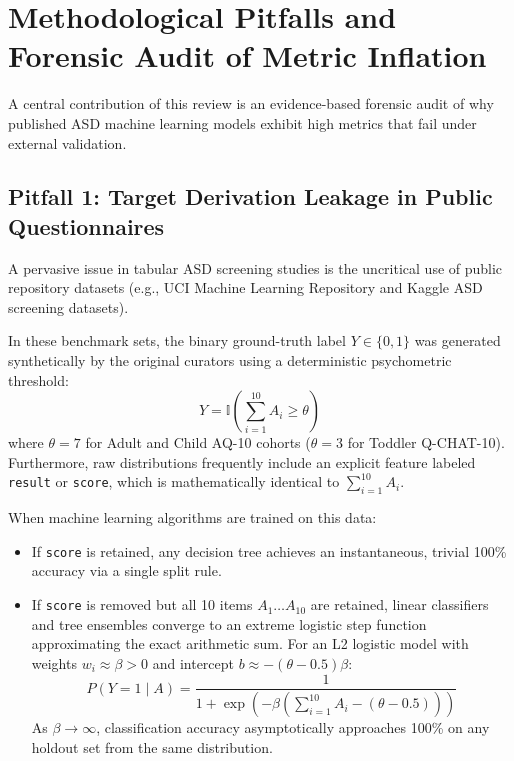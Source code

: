 \documentclass[journal]{IEEEtran}
\begin{document}
\section{Methodological Pitfalls and Forensic Audit of Metric Inflation}

A central contribution of this review is an evidence-based forensic audit of why published ASD machine learning models exhibit high metrics that fail under external validation.

\subsection{Pitfall 1: Target Derivation Leakage in Public Questionnaires}
A pervasive issue in tabular ASD screening studies \cite{thabtah2019machine, mythili2014study} is the uncritical use of public repository datasets (e.g., UCI Machine Learning Repository and Kaggle ASD screening datasets).

In these benchmark sets, the binary ground-truth label $Y \in \{0, 1\}$ was generated synthetically by the original curators using a deterministic psychometric threshold:
\begin{equation}
Y = \mathbb{I}\left(\sum_{i=1}^{10} A_i \ge \theta\right)
\end{equation}
where $\theta = 7$ for Adult and Child AQ-10 cohorts ($\theta = 3$ for Toddler Q-CHAT-10). Furthermore, raw distributions frequently include an explicit feature labeled \texttt{result} or \texttt{score}, which is mathematically identical to $\sum_{i=1}^{10} A_i$.

When machine learning algorithms are trained on this data:
\begin{itemize}
    \item If \texttt{score} is retained, any decision tree achieves an instantaneous, trivial 100\% accuracy via a single split rule.
    \item If \texttt{score} is removed but all 10 items $A_1 \dots A_{10}$ are retained, linear classifiers and tree ensembles converge to an extreme logistic step function approximating the exact arithmetic sum. For an L2 logistic model with weights $w_i \approx \beta > 0$ and intercept $b \approx -(\theta - 0.5) \beta$:
    \begin{equation}
    P(Y=1 \mid A) = \frac{1}{1 + \exp\left(-\beta \left(\sum_{i=1}^{10} A_i - (\theta - 0.5)\right)\right)}
    \end{equation}
    As $\beta \to \infty$, classification accuracy asymptotically approaches 100\% on any holdout set from the same distribution.
\end{itemize}
\end{document}
